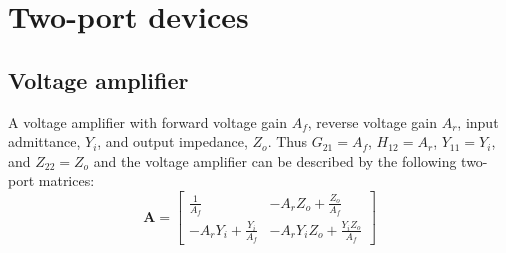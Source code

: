 \documentclass[a4paper, 12pt]{article}
\newcommand{\mat}[1]{\mathbf{#1}}
\begin{document}








\section{Two-port devices}


\subsection{Voltage amplifier}

A voltage amplifier with forward voltage gain $A_f$, reverse voltage
gain $A_r$, input admittance, $Y_i$, and output impedance, $Z_o$.
Thus $G_{21} = A_f$, $H_{12} = A_r$, $Y_{11} = Y_i$, and $Z_{22} =
Z_o$ and the voltage amplifier can be described by the following
two-port matrices:
%
\begin{equation}
\mat{A} = \left[\begin{matrix}\frac{1}{A_{f}} & - A_{r} Z_{o} + \frac{Z_{o}}{A_{f}}\\- A_{r} Y_{i} + \frac{Y_{i}}{A_{f}} & - A_{r} Y_{i} Z_{o} + \frac{Y_{i} Z_{o}}{A_{f}}\end{matrix}\right]
\end{equation}
\end{document}
